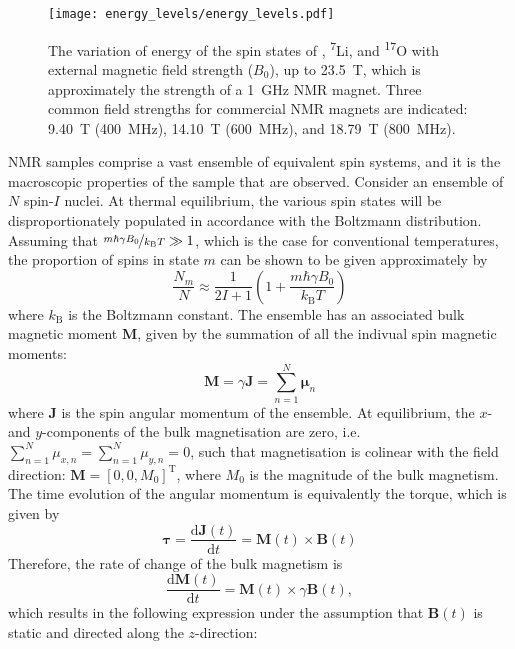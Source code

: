 \begin{figure}
    \centering
    \texttt{[image: energy\_levels/energy\_levels.pdf]}
    \caption[
        The variation of energy of the spin states of \proton,
        \textsuperscript{7}Li, and \textsuperscript{17}O with external magnetic
        field strength.
    ]{
        The variation of energy of the spin states of \proton,
        \textsuperscript{7}Li, and \textsuperscript{17}O with external magnetic
        field strength ($B_0$), up to \qty{23.5}{\tesla}, which is
        approximately the strength of a \qty{1}{\giga \hertz} \ac{NMR} magnet.
        Three common field strengths for commercial NMR magnets are indicated:
        \qty{9.40}{\tesla} (\qty{400}{\mega\hertz}), \qty{14.10}{\tesla}
        (\qty{600}{\mega\hertz}), and \qty{18.79}{\tesla}
        (\qty{800}{\mega\hertz}).
    }
    \label{fig:energy_levels}
\end{figure}
\ac{NMR} samples comprise a vast ensemble of equivalent spin systems, and it is
the macroscopic properties of the sample that are observed. Consider an
ensemble of $N$ spin-$I$ nuclei. At thermal equilibrium, the various spin
states will be disproportionately populated in accordance with the Boltzmann
distribution. Assuming that $\nicefrac{m \hbar \gamma B_0}{k_{\mathrm{B}}T} \gg
1$, which is the case for conventional temperatures, the proportion of spins in
state $m$ can be shown to be given approximately by\cite{Levitt2007}
\begin{equation}
  \frac{N_m}{N} \approx \frac{1}{2I + 1} \left( 1 + \frac{m \hbar \gamma B_0}{k_{\mathrm{B}} T} \right)
\end{equation}
where $k_{\mathrm{B}}$ is the Boltzmann constant. The ensemble has an
associated bulk magnetic moment $\symbf{M}$, given by the summation of all the
indivual spin magnetic moments:
\begin{equation}
  \symbf{M} = \gamma \symbf{J} = \sum\limits_{n=1}^N \symbf{\mu}_n
\end{equation}
where $\symbf{J}$ is the spin angular momentum of the ensemble. At equilibrium,
the $x$- and $y$-components of the bulk magnetisation are zero, i.e.
$\sum_{n=1}^N \mu_{x,n} = \sum_{n=1}^N \mu_{y,n} = 0$, such that magnetisation
is colinear with the field direction: $\symbf{M} = \left[0, 0, M_0
\right]^{\mathrm{T}}$, where $M_0$ is the magnitude of the bulk magnetism. The
time evolution of the angular momentum is equivalently the torque, which is
given by
\begin{equation}
  \symbf{\tau} = \frac{\mathrm{d}\symbf{J}(t)}{\mathrm{d}t} = \symbf{M}(t) \times \symbf{B}(t)
\end{equation}
Therefore, the rate of change of the bulk magnetism is
\begin{equation}
  \frac{\mathrm{d}\symbf{M}(t)}{\mathrm{d}t} = \symbf{M}(t) \times \gamma \symbf{B}(t),
\end{equation}
which results in the following expression under the assumption that
$\symbf{B}(t)$ is static and directed along the $z$-direction:

